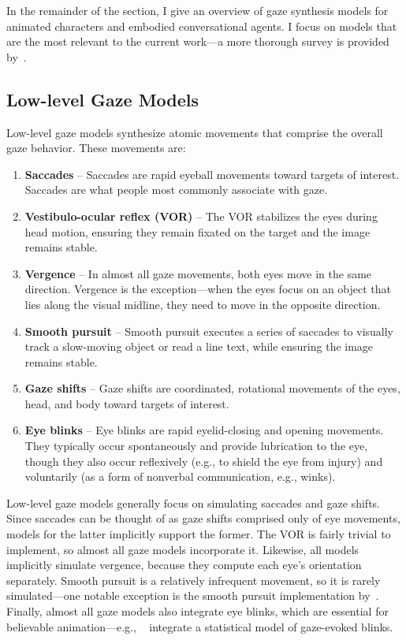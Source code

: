 In the remainder of the section, I give an overview of gaze synthesis models for animated characters and embodied conversational agents. I focus on models that are the most relevant to the current work---a more thorough survey is provided by~\citet{ruhland2015gazereview}.

\subsection{Low-level Gaze Models}

Low-level gaze models synthesize atomic movements that comprise the overall gaze behavior. These movements are:

\begin{enumerate}
\item \textbf{Saccades} -- Saccades are rapid eyeball movements toward targets of interest. Saccades are what people most commonly associate with gaze.
\item \textbf{Vestibulo-ocular reflex (VOR)} -- The VOR stabilizes the eyes during head motion, ensuring they remain fixated on the target and the image remains stable.
\item \textbf{Vergence} -- In almost all gaze movements, both eyes move in the same direction. Vergence is the exception---when the eyes focus on an object that lies along the visual midline, they need to move in the opposite direction.
\item \textbf{Smooth pursuit} -- Smooth pursuit executes a series of saccades to visually track a slow-moving object or read a line text, while ensuring the image remains stable.
\item \textbf{Gaze shifts} -- Gaze shifts are coordinated, rotational movements of the eyes, head, and body toward targets of interest.
\item \textbf{Eye blinks} -- Eye blinks are rapid eyelid-closing and opening movements. They typically occur spontaneously and provide lubrication to the eye, though they also occur reflexively (e.g., to shield the eye from injury) and voluntarily (as a form of nonverbal communication, e.g., winks).
\end{enumerate}

Low-level gaze models generally focus on simulating saccades and gaze shifts. Since saccades can be thought of as gaze shifts comprised only of eye movements, models for the latter implicitly support the former. The VOR is fairly trivial to implement, so almost all gaze models incorporate it. Likewise, all models implicitly simulate vergence, because they compute each eye's orientation separately. Smooth pursuit is a relatively infrequent movement, so it is rarely simulated---one notable exception is the smooth pursuit implementation by~\citet{yeo2012eyecatch}. Finally, almost all gaze models also integrate eye blinks, which are essential for believable animation---e.g., ~\citet{peters2010animating} integrate a statistical model of gaze-evoked blinks.

